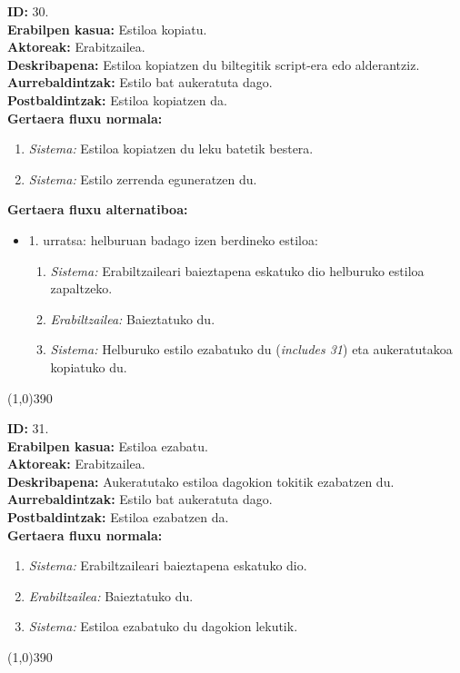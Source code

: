 \noindent
\textbf{ID:} 30.\\
\textbf{Erabilpen kasua:} Estiloa kopiatu.\\
\textbf{Aktoreak:} Erabitzailea.\\
\textbf{Deskribapena:} Estiloa kopiatzen du biltegitik script-era edo alderantziz.\\
\textbf{Aurrebaldintzak:} Estilo bat aukeratuta dago.\\
\textbf{Postbaldintzak:} Estiloa kopiatzen da.\\
\textbf{Gertaera fluxu normala:}
\begin{enumerate}
	\item \textit{Sistema:} Estiloa kopiatzen du leku batetik bestera.
	\item \textit{Sistema:} Estilo zerrenda eguneratzen du.
\end{enumerate}
\textbf{Gertaera fluxu alternatiboa:}
\begin{itemize}
	\item 1. urratsa: helburuan badago izen berdineko estiloa:
		\begin{enumerate}
		\item \textit{Sistema:} Erabiltzaileari baieztapena eskatuko dio helburuko estiloa zapaltzeko.
		\item \textit{Erabiltzailea:} Baieztatuko du.
		\item \textit{Sistema:} Helburuko estilo ezabatuko du (\textit{includes 31}) eta aukeratutakoa kopiatuko du.
		\end{enumerate}
\end{itemize}
\line(1,0){390}

\noindent
\textbf{ID:} 31.\\
\textbf{Erabilpen kasua:} Estiloa ezabatu.\\
\textbf{Aktoreak:} Erabitzailea.\\
\textbf{Deskribapena:} Aukeratutako estiloa dagokion tokitik ezabatzen du.\\
\textbf{Aurrebaldintzak:} Estilo bat aukeratuta dago.\\
\textbf{Postbaldintzak:} Estiloa ezabatzen da.\\
\textbf{Gertaera fluxu normala:}
\begin{enumerate}
	\item \textit{Sistema:} Erabiltzaileari baieztapena eskatuko dio.
	\item \textit{Erabiltzailea:} Baieztatuko du.
	\item \textit{Sistema:} Estiloa ezabatuko du dagokion lekutik.
\end{enumerate}
\line(1,0){390}


